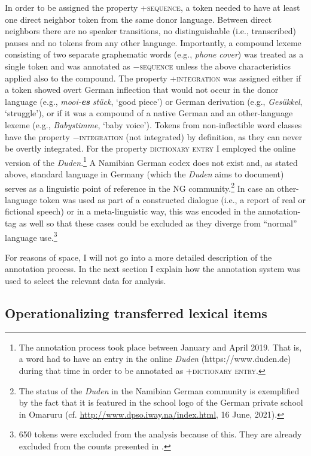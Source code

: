 \documentclass[output=paper]{langsci/langscibook}
\begin{document}
In order to be assigned the property \textsc{+sequence,} a token needed to have at least one direct neighbor token from the same donor language. Between direct neighbors there are no speaker transitions, no distinguishable (i.e., transcribed) pauses and no tokens from any other language. Importantly, a compound lexeme consisting of two separate graphematic words (e.g., \textit{phone} \textit{cover}) was treated as a single token and was annotated as −\textsc{sequence} unless the above characteristics applied also to the compound. The property \textsc{+integration} was assigned either if a token showed overt German inflection that would not occur in the donor language (e.g., \textit{mooi-}\textbf{\textit{es}} \textit{stück}, ‘good piece’) or German derivation (e.g., \textit{Gesükkel}, ‘struggle’), or if it was a compound of a native German and an other-language lexeme (e.g., \textit{Babystimme}, ‘baby voice’). Tokens from non-inflectible word classes have the property −\textsc{integration} (not integrated) by definition, as they can never be overtly integrated. For the property \textsc{dictionary} \textsc{entry} I employed the online version of the \textit{Duden}.\footnote{The annotation process took place between January and April 2019. That is, a word had to have an entry in the online \textit{Duden} (https://www.duden.de) during that time in order to be annotated as +\textsc{dictionary} \textsc{entry}.} A Namibian German codex does not exist and, as stated above, standard language in Germany (which the \textit{Duden} aims to document) serves as a linguistic point of reference in the NG community.\footnote{The status of the \textit{Duden} in the Namibian German community is exemplified by the fact that it is featured in the school logo of the German private school in Omaruru (cf. \url{http://www.dpso.iway.na/index.html}, 16 June, 2021).} In case an other-language token was used as part of a constructed dialogue (i.e., a report of real or fictional speech) or in a meta-linguistic way, this was encoded in the annotation-tag as well so that these cases could be excluded as they diverge from “normal” language use.\footnote{650 tokens were excluded from the analysis because of this. They are already excluded from the counts presented in .}

For reasons of space, I will not go into a more detailed description of the annotation process. In the next section I explain how the annotation system was used to select the relevant data for analysis.
  
\subsection{Operationalizing transferred lexical items}
\label{sec:bracke:4.3}
\end{document}
